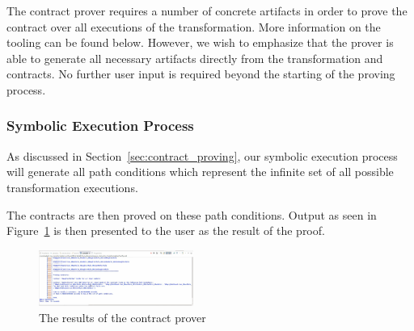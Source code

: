 The contract prover requires a number of concrete artifacts in order to prove the contract over all executions of the transformation. More information on the tooling can be found below. However, we wish to emphasize that the prover is able to generate all necessary artifacts directly from the transformation and contracts. No further user input is required beyond the starting of the proving process.




\subsubsection{Symbolic Execution Process}

As discussed in Section~\ref{sec:contract_proving}, our symbolic execution process will generate all path conditions which represent the infinite set of all possible transformation executions.

The contracts are then proved on these path conditions. Output as seen in Figure~\ref{fig:output} is then presented to the user as the result of the proof.


\begin{figure}
\centering
\includegraphics[width=0.45\textwidth]{figures/syvolt_prover/output}
\caption{The results of the contract prover}
\label{fig:output}
\end{figure}


